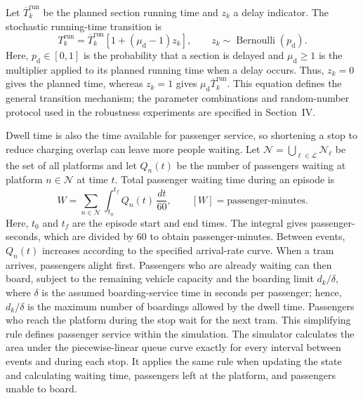 \documentclass[conference]{IEEEtran}
\begin{document}
Let $\overline{T}^{\mathrm{run}}_k$ be the planned section running time and $z_k$ a delay indicator. The stochastic running-time transition is
\begin{equation}
 T^{\mathrm{run}}_k=\overline{T}^{\mathrm{run}}_k
 \left[1+(\mu_{\mathrm d}-1)z_k\right],
 \qquad z_k\sim\operatorname{Bernoulli}(p_{\mathrm d}).
\end{equation}
Here, $p_{\mathrm d}\in[0,1]$ is the probability that a section is delayed and $\mu_{\mathrm d}\geq1$ is the multiplier applied to its planned running time when a delay occurs. Thus, $z_k=0$ gives the planned time, whereas $z_k=1$ gives $\mu_{\mathrm d}\overline{T}^{\mathrm{run}}_k$. This equation defines the general transition mechanism; the parameter combinations and random-number protocol used in the robustness experiments are specified in Section~IV.

Dwell time is also the time available for passenger service, so shortening a stop to reduce charging overlap can leave more people waiting. Let $\mathcal{N}=\bigcup_{\ell\in\mathcal{L}}\mathcal{N}_{\ell}$ be the set of all platforms and let $Q_n(t)$ be the number of passengers waiting at platform $n\in\mathcal{N}$ at time $t$. Total passenger waiting time during an episode is
\begin{equation}
 W=\sum_{n\in\mathcal{N}}\int_{t_0}^{t_f}Q_n(t)\,\frac{dt}{60},
 \qquad [W]=\text{passenger-minutes}.
\end{equation}
Here, $t_0$ and $t_f$ are the episode start and end times. The integral gives passenger-seconds, which are divided by 60 to obtain passenger-minutes. Between events, $Q_n(t)$ increases according to the specified arrival-rate curve. When a tram arrives, passengers alight first. Passengers who are already waiting can then board, subject to the remaining vehicle capacity and the boarding limit $d_k/\delta$, where $\delta$ is the assumed boarding-service time in seconds per passenger; hence, $d_k/\delta$ is the maximum number of boardings allowed by the dwell time. Passengers who reach the platform during the stop wait for the next tram. This simplifying rule defines passenger service within the simulation. The simulator calculates the area under the piecewise-linear queue curve exactly for every interval between events and during each stop. It applies the same rule when updating the state and calculating waiting time, passengers left at the platform, and passengers unable to board.
\end{document}

